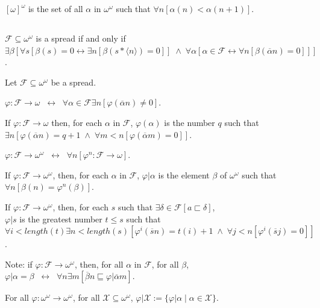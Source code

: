 \documentclass[a4paper]{amsart}
\theoremstyle{plain}
\begin{document}
\smallskip $[\omega]^\omega$ is the set of all $\alpha$ in $\omega^\omega$ such that $\forall n[\alpha(n)<\alpha(n+1)]$.

\subsection{}$\mathcal{F}\subseteq\omega^\omega$ is a spread if and only if \\$\exists \beta[\forall s[\beta(s)=0\leftrightarrow\exists n[\beta(s\ast\langle n \rangle )=0]]\;\wedge\;\forall\alpha[\alpha \in \mathcal{F}\leftrightarrow \forall n[\beta(\overline\alpha n)=0]]]$.

\smallskip Let $\mathcal{F}\subseteq \omega^\omega$ be a spread.

 $\varphi:\mathcal{F}\rightarrow\omega\;\;\leftrightarrow\;\; \forall \alpha\in \mathcal{F}\exists n[\varphi(\overline \alpha n)\neq 0]$. 

If $\varphi:\mathcal{F}\rightarrow\omega$ then, for each $\alpha$ in $\mathcal{F}$, $\varphi(\alpha)$ is the number $q$ such that $\exists n[\varphi(\overline \alpha n)=q+1\;\wedge\;\forall m<n[\varphi(\overline \alpha m)=0]]$.

\medskip
$\varphi:\mathcal{F}\rightarrow \omega^\omega\;\;\leftrightarrow \;\;\forall n[\varphi^n:\mathcal{F}\rightarrow \omega]$.

If $\varphi:\mathcal{F}\rightarrow \omega^\omega$, then, for each $\alpha$ in $\mathcal{F}$, $\varphi|\alpha$ is the element $\beta$ of $\omega^\omega$ such that $\forall n[\beta(n)=\varphi^n(\beta)]$. 

\smallskip If $\varphi:\mathcal{F}\rightarrow \omega^\omega$, then, for each $s$ such that $\exists \delta \in \mathcal{F}[a\sqsubset\delta]$, \\$\varphi|s$ is the greatest number $t\le s$ such that \\$\forall i<length(t)\exists n<length(s) [\varphi^i(\overline s n) =t(i)+1\;\wedge\;\forall j<n[\varphi^i(\overline s j)=0]]$. 

Note: if $\varphi:\mathcal{F}\rightarrow \omega^\omega$, then, for all $\alpha$ in $\mathcal{F}$, for all $ \beta$,\\ $\varphi|\alpha =\beta \;\;\leftrightarrow \;\;\forall n \exists m[\overline \beta n\sqsubseteq \varphi|\overline \alpha m]$. 

\smallskip
For all $\varphi:\omega^\omega\rightarrow\omega^\omega$, for all $\mathcal{X}\subseteq \omega^\omega$, $\varphi|\mathcal{X}:=\{\varphi|\alpha\mid\alpha\in \mathcal{X}\}$.
\end{document}
